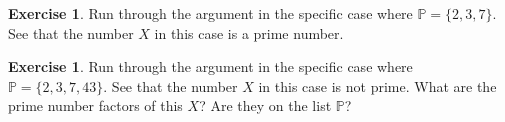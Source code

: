 \documentclass[12pt,letterpaper]{article}
\theoremstyle{definition}
\newtheorem{exercise}[question]{Exercise}
\begin{document}
\begin{exercise}
Run through the argument in the specific case where $\mathbb{P} =\{2, 3, 7\}$.
See that the number $X$ in this case is a prime number.
\end{exercise}

\begin{exercise}
Run through the argument in the specific case where $\mathbb{P} =\{2, 3, 7, 43\}$.
See that the number $X$ in this case is not prime.
What are the prime number factors of this $X$?
Are they on the list $\mathbb{P}$?
\end{exercise}

\end{document}
